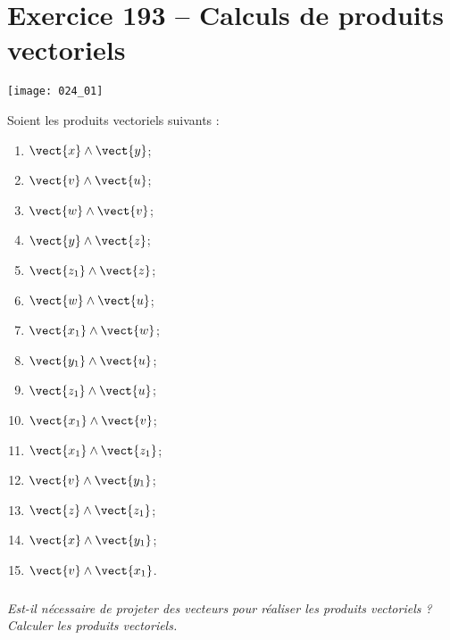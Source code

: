 \section*{Exercice 193 -- Calculs de produits vectoriels}
\setcounter{exo}{0}


\begin{center}
\texttt{[image: 024\_01]}
\end{center}

Soient les produits vectoriels suivants : 
\begin{multicols}{3}
\begin{enumerate}
\item $\vect{x}\wedge\vect{y}$;
\item $\vect{v}\wedge\vect{u}$;
\item $\vect{w}\wedge\vect{v}$;
\item $\vect{y}\wedge\vect{z}$;
\item $\vect{z_1}\wedge\vect{z}$;
\item $\vect{w}\wedge\vect{u}$;
\item $\vect{x_1}\wedge\vect{w}$;
\item $\vect{y_1}\wedge\vect{u}$;
\item $\vect{z_1}\wedge\vect{u}$;
\item $\vect{x_1}\wedge\vect{v}$;
\item $\vect{x_1}\wedge\vect{z_1}$;
\item $\vect{v}\wedge\vect{y_1}$;
\item $\vect{z}\wedge\vect{z_1}$;
\item $\vect{x}\wedge\vect{y_1}$;
\item $\vect{v}\wedge\vect{x_1}$.
\end{enumerate}
\end{multicols}
\subparagraph{}
\textit{Est-il nécessaire de projeter des vecteurs pour réaliser les produits vectoriels ? Calculer les produits vectoriels.}


